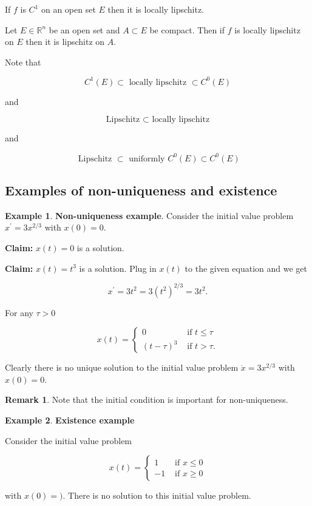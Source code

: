\documentclass[12pt]{article}
\theoremstyle{definition}
\newtheorem*{example}{Example}
\newtheorem*{remark}{Remark}
\begin{document}
If $f$ is $C^1$ on an open set $E$ then it is locally lipschitz.

Let $E \in \mathbb{R}^n$ be an open set and $A \subset E$ be compact. Then if $f$
is locally lipschitz on $E$ then it is lipschitz on $A$.

Note that 

\[
C^1(E) \subset \text{ locally lipschitz } \subset C^{0}(E)
\]

and 

\[
\text{ Lipschitz } \subset \text{ locally lipschitz }
\]

and

\[
\text{ Lipschitz } \subset \text{ uniformly } C^0(E) \subset C^0(E)
\]

\subsection{Examples of non-uniqueness and existence}

\begin{example}
\textbf{Non-uniqueness example}. Consider the initial value problem $x^{\prime} = 3 x^{2/3}$ with 
$x(0) = 0$.

\textbf{Claim:} $x(t) = 0$ is a solution.

\textbf{Claim:} $x(t) = t^3$ is a solution. Plug in $x(t)$ to the given equation and we get

\[
x^{\prime} = 3t^2 = 3(t^2)^{2/3} = 3t^2.
\]

For any $\tau > 0$ 

\[
x(t) = 
\begin{cases}
0 & \text{ if } t \leq \tau \\
(t - \tau)^3 & \text{ if } t > \tau.
\end{cases}
\]

Clearly there is no unique solution to the initial value problem $\dot{x} = 3x^{2/3}$ with
$x(0) = 0$.
\end{example}

\begin{remark}
Note that the initial condition is important for non-uniqueness.
\end{remark}

\begin{example}
\textbf{Existence example}

Consider the initial value problem

\[
x(t) =
\begin{cases}
1 & \text{ if } x \leq 0 \\
-1 & \text{ if } x \geq 0
\end{cases}
\]

with $x(0) = )$. There is no solution to this initial value problem.
\end{example}
\end{document}
